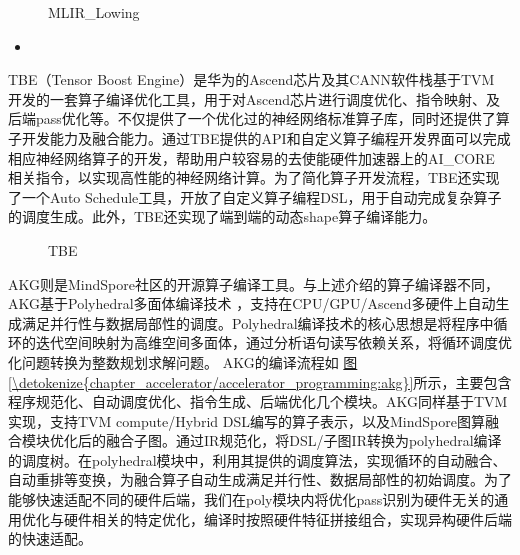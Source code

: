 \documentclass[letterpaper,10pt,english]{sphinxmanual}
\let\sphinxpxdimen\pdfpxdimen\else\newdimen\sphinxpxdimen
\begin{document}
\begin{figure}[H]
\centering
\capstart

\noindent\sphinxincludegraphics[width=800\sphinxpxdimen]{{MLIR-Lowing}.svg}
\caption{MLIR\_Lowing}\label{\detokenize{chapter_accelerator/accelerator_programming:id19}}\label{\detokenize{chapter_accelerator/accelerator_programming:mlir-lowing}}\end{figure}
\begin{itemize}
\item {} 
\sphinxAtStartPar
{}

\end{itemize}

\sphinxAtStartPar
TBE（Tensor Boost Engine）是华为的Ascend芯片及其CANN软件栈基于TVM
开发的一套算子编译优化工具，用于对Ascend芯片进行调度优化、指令映射、及后端pass优化等。不仅提供了一个优化过的神经网络标准算子库，同时还提供了算子开发能力及融合能力。通过TBE提供的API和自定义算子编程开发界面可以完成相应神经网络算子的开发，帮助用户较容易的去使能硬件加速器上的AI\_CORE
相关指令，以实现高性能的神经网络计算。为了简化算子开发流程，TBE还实现了一个Auto
Schedule工具，开放了自定义算子编程DSL，用于自动完成复杂算子的调度生成。此外，TBE还实现了端到端的动态shape算子编译能力。

\begin{figure}[H]
\centering
\capstart

\noindent\sphinxincludegraphics[width=800\sphinxpxdimen]{{TBE}.svg}
\caption{TBE}\label{\detokenize{chapter_accelerator/accelerator_programming:id20}}\label{\detokenize{chapter_accelerator/accelerator_programming:tbe}}\end{figure}

\sphinxAtStartPar
AKG则是MindSpore社区的开源算子编译工具。与上述介绍的算子编译器不同，AKG基于Polyhedral多面体编译技术
，支持在CPU/GPU/Ascend多硬件上自动生成满足并行性与数据局部性的调度。Polyhedral编译技术的核心思想是将程序中循环的迭代空间映射为高维空间多面体，通过分析语句读写依赖关系，将循环调度优化问题转换为整数规划求解问题。
AKG的编译流程如
\hyperref[\detokenize{chapter_accelerator/accelerator_programming:akg}]{图\ref{\detokenize{chapter_accelerator/accelerator_programming:akg}}}所示，主要包含程序规范化、自动调度优化、指令生成、后端优化几个模块。AKG同样基于TVM实现，支持TVM
compute/Hybrid
DSL编写的算子表示，以及MindSpore图算融合模块优化后的融合子图。通过IR规范化，将DSL/子图IR转换为polyhedral编译的调度树。在polyhedral模块中，利用其提供的调度算法，实现循环的自动融合、自动重排等变换，为融合算子自动生成满足并行性、数据局部性的初始调度。为了能够快速适配不同的硬件后端，我们在poly模块内将优化pass识别为硬件无关的通用优化与硬件相关的特定优化，编译时按照硬件特征拼接组合，实现异构硬件后端的快速适配。
\end{document}

